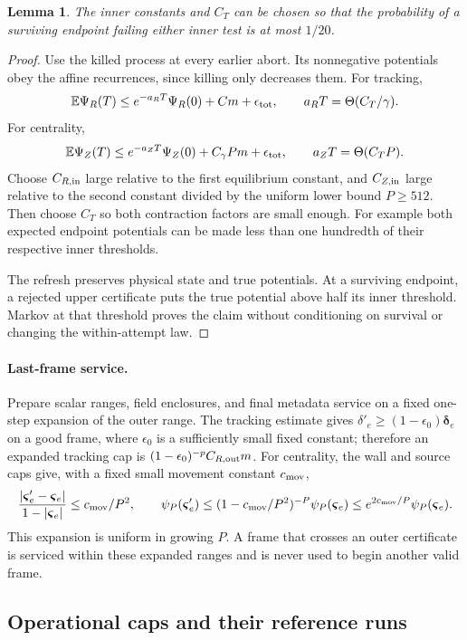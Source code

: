 \documentclass[11pt]{article}
\newtheorem{lemma}[theorem]{Lemma}
\theoremstyle{remark}
\newcommand{\vvs}{\boldsymbol{\varsigma}}
\newcommand{\ddelta}{\boldsymbol{\delta}}
\newcommand{\Ex}{\mathbb E}
\begin{document}
\begin{lemma}
\label{lem:ram-inner-return}
The inner constants and $C_T$ can be chosen so that the probability of a
surviving endpoint failing either inner test is at most $1/20$.
\end{lemma} \begin{proof} Use the killed process at every earlier abort.
Its nonnegative potentials obey the affine recurrences, since killing only
decreases them.
For tracking,
\[
 \Ex\Psi_R(T)
 \le e^{-a_RT}\Psi_R(0)+Cm+\epsilon_{\rm tot},
 \qquad a_RT=\Theta(C_T/\gamma).
\]
For centrality,
\[
 \Ex\Psi_Z(T)
 \le e^{-a_ZT}\Psi_Z(0)+C_\gamma Pm+\epsilon_{\rm tot},
 \qquad a_ZT=\Theta(C_TP).
\]
Choose $C_{R,\rm in}$ large relative to the first equilibrium constant, and
$C_{Z,\rm in}$ large relative to the second constant divided by the uniform
lower bound $P\ge512$.
Then choose $C_T$ so both contraction factors are small enough.
For example both expected endpoint potentials can be made less than one
hundredth of their respective inner thresholds.

The refresh preserves physical state and true potentials.
At a surviving endpoint, a rejected upper certificate puts the true potential
above half its inner threshold.
Markov at that threshold proves the claim without conditioning on survival or
changing the within-attempt law.
\end{proof}

\paragraph{Last-frame service.}
Prepare scalar ranges, field enclosures, and final metadata service on a fixed
one-step expansion of the outer range.
The tracking estimate gives $\delta'_e\ge(1-\epsilon_0)\ddelta_e$ on a good
frame, where $\epsilon_0$ is a sufficiently small fixed constant; therefore an
expanded tracking cap is $(1-\epsilon_0)^{-p}C_{R,\rm out}m$.
For centrality, the wall and source caps give, with a fixed small movement
constant $c_{\rm mov}$,
\[
 \frac{|\vvs'_e-\vvs_e|}{1-|\vvs_e|}\le c_{\rm mov}/P^2,
 \qquad
 \psi_P(\vvs'_e)\le(1-c_{\rm mov}/P^2)^{-P}\psi_P(\vvs_e)
                              \le e^{2c_{\rm mov}/P}\psi_P(\vvs_e).
\]
This expansion is uniform in growing $P$.
A frame that crosses an outer certificate is serviced within these expanded
ranges and is never used to begin another valid frame.

\subsection{Operational caps and their reference runs}
\end{document}
